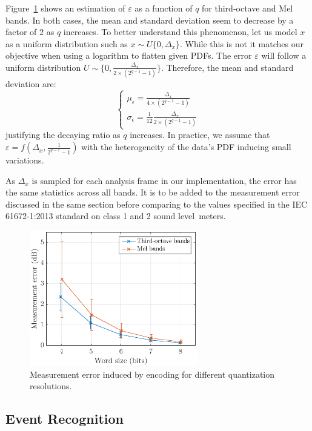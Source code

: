 \documentclass[sensors,article,accept,moreauthors,pdftex,10pt,a4paper]{mdpi}
\begin{document}
Figure~\ref{fig:error_q} shows an estimation of $\varepsilon$ as a function of $q$ for third-octave and Mel bands. In both cases, the mean and standard deviation seem to decrease by a factor of 2 as $q$ increases. To better understand this phenomenon, let us model $x$ as a uniform distribution such as $x\sim \textit{U}\{0, \Delta_x\}$. While this is not  it matches our objective when using a logarithm to flatten given PDFs. The error $\varepsilon$ will follow a uniform distribution $U\sim \{0, \frac{\Delta_x}{2\times (2^{q-1}-1)}\}$. Therefore, the mean and standard deviation are:
\[
\begin{cases}
	\mu_\epsilon = \frac{\Delta_x}{4\times (2^{q-1}-1)}\\
	\sigma_\epsilon = \frac{1}{12}\frac{\Delta_x}{2\times (2^{q-1}-1)}
\end{cases}
\]
justifying the decaying ratio as $q$ increases. In practice, we assume that $\varepsilon = f(\Delta_x, \frac{1}{2^{q-1}-1})$ with the heterogeneity of the data's PDF inducing small variations.

As $\Delta_x$ is sampled for each analysis frame in our implementation, the error has the same statistics across all bands. It is to be added to the measurement error discussed in the same section before comparing to the values specified in the IEC 61672-1:2013 \cite{iec-norm2} standard on class 1 and 2 sound \mbox{level meters.}

\begin{figure}[H]
	\centering
		\includegraphics[width=0.65\textwidth]{figures/error_qall.eps}
	\caption{Measurement error induced by encoding for different quantization resolutions.}
	\label{fig:error_q}
\end{figure}



\subsection{Event Recognition} \label{sec:event_r}
\end{document}

